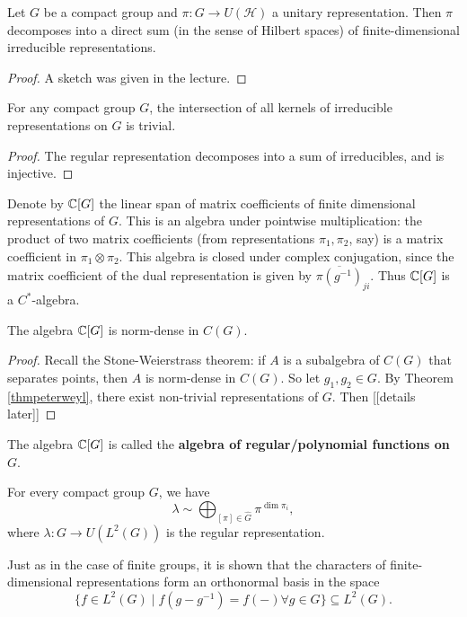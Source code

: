 \documentclass[11pt, english]{article}
\begin{document}
\begin{thm}
\label{thmpeterweyl}
Let $G$ be a compact group and $\pi:G \to U(\mathcal H)$ a unitary representation. Then $\pi$ decomposes into a direct sum (in the sense of Hilbert spaces) of finite-dimensional irreducible representations.
  
\end{thm}

\begin{proof}
A sketch was given in the lecture.
\end{proof}

\begin{corr}
For any compact group $G$, the intersection of all kernels of irreducible representations on $G$ is trivial.
\end{corr}
\begin{proof}
The regular representation decomposes into a sum of irreducibles, and is injective. 
\end{proof}

Denote by $\mathbb{C}[G]$ the linear span of matrix coefficients of finite dimensional representations of $G$. This is an algebra under pointwise multiplication: the product of two matrix coefficients (from representations $\pi_1,\pi_2$, say) is a matrix coefficient in $\pi_1 \otimes \pi_2$. This algebra is closed under complex conjugation, since the matrix coefficient of the dual representation is given by $\overline{\pi(g^{-1})}_{ji}$. Thus $\mathbb{C}[G]$ is a $C^\ast$-algebra.

\begin{corr}
  The algebra $\mathbb{C}[G]$ is norm-dense in $C(G)$.
\end{corr}
\begin{proof}
Recall the Stone-Weierstrass theorem: if $A$ is a subalgebra of $C(G)$ that separates points, then $A$ is norm-dense in $C(G)$. So let $g_1,g_2 \in G$. By Theorem \ref{thmpeterweyl}, there exist non-trivial representations of $G$. Then [[details later]]
\end{proof}

The algebra $\mathbb{C}[G]$ is called the \textbf{algebra of regular/polynomial functions on $G$}.

\begin{thm}
  For every compact group $G$, we have 
$$
\lambda \sim \bigoplus_{[\pi] \in \widehat G} \pi^{\dim \pi_i},
$$
where $\lambda:G \to U(L^2(G))$ is the regular representation.
\end{thm}

Just as in the case of finite groups, it is shown that the characters of finite-dimensional representations form an orthonormal basis in the space 
$$
\{ f \in L^2(G) \mid f(g - g^{-1}) = f(-) \forall g \in G \} \subseteq L^2(G).
$$
\end{document}
